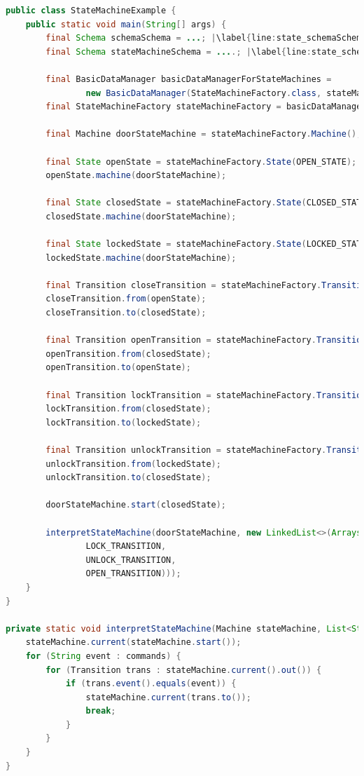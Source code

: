 \begin{sourcecode}
	\begin{lstlisting}[language=Java, escapechar=|]
public class StateMachineExample {
	public static void main(String[] args) {
		final Schema schemaSchema = ...; |\label{line:state_schemaSchema}|
		final Schema stateMachineSchema = ....; |\label{line:state_schemaMachineSchema}|

		final BasicDataManager basicDataManagerForStateMachines = 
				new BasicDataManager(StateMachineFactory.class, stateMachineSchema);  |\label{line:state_meaning_full_code}|
		final StateMachineFactory stateMachineFactory = basicDataManagerForStateMachines.make();

		final Machine doorStateMachine = stateMachineFactory.Machine(); |\label{line:state_machine_creation_basic}|

		final State openState = stateMachineFactory.State(OPEN_STATE);
		openState.machine(doorStateMachine);

		final State closedState = stateMachineFactory.State(CLOSED_STATE);
		closedState.machine(doorStateMachine);

		final State lockedState = stateMachineFactory.State(LOCKED_STATE);
		lockedState.machine(doorStateMachine);

		final Transition closeTransition = stateMachineFactory.Transition(CLOSE_TRANSITION);
		closeTransition.from(openState);
		closeTransition.to(closedState);

		final Transition openTransition = stateMachineFactory.Transition(OPEN_TRANSITION);
		openTransition.from(closedState);
		openTransition.to(openState);

		final Transition lockTransition = stateMachineFactory.Transition(LOCK_TRANSITION);
		lockTransition.from(closedState);
		lockTransition.to(lockedState);

		final Transition unlockTransition = stateMachineFactory.Transition(UNLOCK_TRANSITION);
		unlockTransition.from(lockedState);
		unlockTransition.to(closedState);

		doorStateMachine.start(closedState);

		interpretStateMachine(doorStateMachine, new LinkedList<>(Arrays.asList(
		        LOCK_TRANSITION,
		        UNLOCK_TRANSITION,
		        OPEN_TRANSITION)));
	}
}

private static void interpretStateMachine(Machine stateMachine, List<String> commands) { |\label{line:state_machine_interpreter}|
    stateMachine.current(stateMachine.start());
    for (String event : commands) {
        for (Transition trans : stateMachine.current().out()) {
            if (trans.event().equals(event)) {
                stateMachine.current(trans.to());
                break;
            }
        }
    }
}   
	\end{lstlisting}
	\caption{Door state machine}
	\label{lst:Door_state_machine}
\end{sourcecode}

